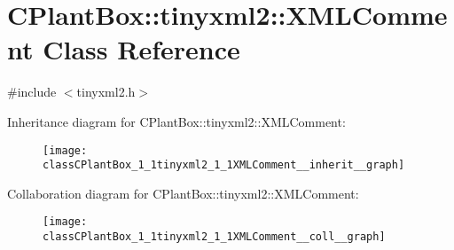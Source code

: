 \hypertarget{classCPlantBox_1_1tinyxml2_1_1XMLComment}{}\section{C\+Plant\+Box\+:\+:tinyxml2\+:\+:X\+M\+L\+Comment Class Reference}
\label{classCPlantBox_1_1tinyxml2_1_1XMLComment}


{\ttfamily \#include $<$tinyxml2.\+h$>$}



Inheritance diagram for C\+Plant\+Box\+:\+:tinyxml2\+:\+:X\+M\+L\+Comment\+:\nopagebreak
\begin{figure}[H]
\begin{center}
\leavevmode
\texttt{[image: classCPlantBox\_1\_1tinyxml2\_1\_1XMLComment\_\_inherit\_\_graph]}
\end{center}
\end{figure}


Collaboration diagram for C\+Plant\+Box\+:\+:tinyxml2\+:\+:X\+M\+L\+Comment\+:\nopagebreak
\begin{figure}[H]
\begin{center}
\leavevmode
\texttt{[image: classCPlantBox\_1\_1tinyxml2\_1\_1XMLComment\_\_coll\_\_graph]}
\end{center}
\end{figure}

